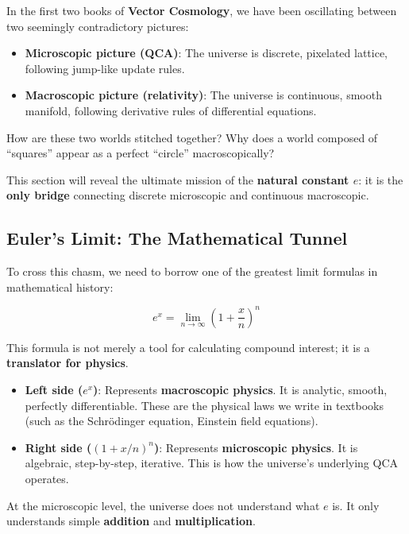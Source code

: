 \documentclass[11pt,a4paper,twoside]{book}
\begin{document}
In the first two books of \textbf{Vector Cosmology}, we have been oscillating between two seemingly contradictory pictures:

\begin{itemize}
\item \textbf{Microscopic picture (QCA)}: The universe is discrete, pixelated lattice, following jump-like update rules.

\item \textbf{Macroscopic picture (relativity)}: The universe is continuous, smooth manifold, following derivative rules of differential equations.
\end{itemize}

How are these two worlds stitched together? Why does a world composed of ``squares'' appear as a perfect ``circle'' macroscopically?

This section will reveal the ultimate mission of the \textbf{natural constant $e$}: it is the \textbf{only bridge} connecting discrete microscopic and continuous macroscopic.

\subsection{Euler's Limit: The Mathematical Tunnel}

To cross this chasm, we need to borrow one of the greatest limit formulas in mathematical history:

$$e^x = \lim_{n \to \infty} \left(1 + \frac{x}{n}\right)^n$$

This formula is not merely a tool for calculating compound interest; it is a \textbf{translator for physics}.

\begin{itemize}
\item \textbf{Left side ($e^x$)}: Represents \textbf{macroscopic physics}. It is analytic, smooth, perfectly differentiable. These are the physical laws we write in textbooks (such as the Schrödinger equation, Einstein field equations).

\item \textbf{Right side ($(1 + x/n)^n$)}: Represents \textbf{microscopic physics}. It is algebraic, step-by-step, iterative. This is how the universe's underlying QCA operates.
\end{itemize}

At the microscopic level, the universe does not understand what $e$ is. It only understands simple \textbf{addition} and \textbf{multiplication}.
\end{document}
